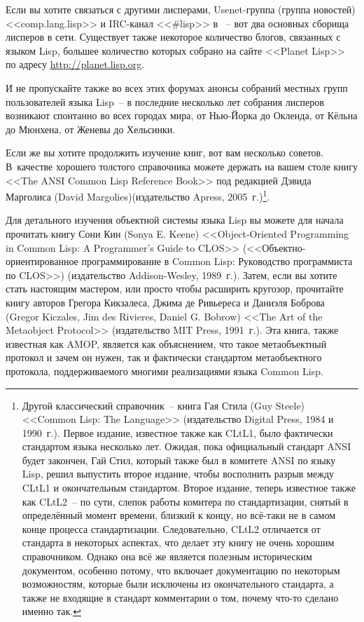 Если вы хотите связаться с другими лисперами, Usenet-группа (группа новостей)
<<comp.lang.lisp>> и IRC-канал <<\#lisp>> в ~-- вот два основных сборища лисперов в сети. Существует также некоторое количество блогов,
связанных с языком Lisp, большее количество которых собрано на сайте <<Planet Lisp>>
по адресу \url{http://planet.lisp.org}.

И не пропускайте также во всех этих форумах анонсы собраний местных групп пользователей
языка Lisp~-- в последние несколько лет собрания лисперов возникают спонтанно во всех
городах мира, от Нью-Йорка до Окленда, от Кёльна до Мюнхена, от Женевы до Хельсинки.

Если же вы хотите продолжить изучение книг, вот вам несколько советов. В~качестве хорошего
толстого справочника можете держать на вашем столе книгу <<The ANSI Common Lisp Reference
Book>> под редакцией Дэвида Марголиса (David Margolies)(издательство Apress,
2005~г.)\footnote{Другой классический справочник~-- книга Гая Стила (Guy Steele) <<Common
  Lisp: The Language>> (издательство Digital Press, 1984 и 1990~г.). Первое издание,
  известное также как CLtL1, было фактически стандартом языка несколько лет. Ожидая, пока
  официальный стандарт ANSI будет закончен, Гай Стил, который также был в комитете ANSI по
  языку Lisp, решил выпустить второе издание, чтобы восполнить разрыв между CLtL1 и
  окончательным стандартом. Второе издание, теперь известное также как CLtL2~-- по сути,
  слепок работы комитера по стандартизации, снятый в определённый момент времени, близкий
  к концу, но всё-таки не в самом конце процесса стандартизации. Следовательно, CLtL2
  отличается от стандарта в некоторых аспектах, что делает эту книгу не очень хорошим
  справочником. Однако она всё же является полезным историческим документом, особенно
  потому, что включает документацию по некоторым возможностям, которые были исключены из
  окончательного стандарта, а также не входящие в стандарт комментарии о том, почему
  что-то сделано именно так.}.

Для детального изучения объектной системы языка Lisp вы можете для начала прочитать книгу
Сони Кин (Sonya E. Keene) <<Object-Oriented Programming in Common Lisp: A Programmer's
Guide to CLOS>> (<<Объектно-ориентированное программирование в Common Lisp: Руководство
программиста по CLOS>>) (издательство Addison-Wesley, 1989~г.). Затем, если вы хотите
стать настоящим мастером, или просто чтобы расширить кругозор, прочитайте книгу авторов
Грегора Кикзалеса, Джима де Ривьереса и Даниэля Боброва (Gregor Kiczales, Jim des
Rivieres, Daniel G. Bobrow) <<The Art of the Metaobject Protocol>> (издательство MIT
Press, 1991~г.). Эта книга, также известная как AMOP, является как объяснением, что такое
метаобъектный протокол и зачем он нужен, так и фактически стандартом метаобъектного
протокола, поддерживаемого многими реализациями языка Common Lisp.

